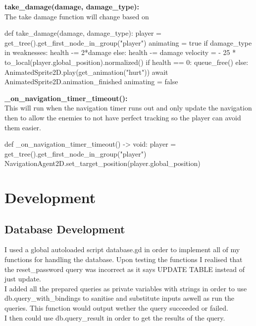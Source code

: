 \documentclass{article}
\begin{document}
        \textbf{take\_damage(damage, damage\_type):}\\
        The take damage function will change based on 
        \begin{python}
def take_damage(damage, damage_type):
   player = get_tree().get_first_node_in_group("player")
   animating = true
   if damage_type in weaknesses:
      health -= 2*damage
   else:
      health -= damage
   velocity = - 25 * to_local(player.global_position).normalized()
   if health == 0:
      queue_free()
   else:
      AnimatedSprite2D.play(get_animation("hurt"))
      await AnimatedSprite2D.animation_finished
      animating = false
        \end{python}
        \textbf{\_on\_navigation\_timer\_timeout():}\\
        This will run when the navigation timer runs out and only update the navigation then to allow the enemies to not have perfect tracking so the player can avoid them easier.\\
        \begin{python}
def _on_navigation_timer_timeout() -> void:
   player = get_tree().get_first_node_in_group("player")
   NavigationAgent2D.set_target_position(player.global_position)
        \end{python}

        \section{Development}
        \subsection{Database Development}
        I used a global autoloaded script database.gd in order to implement all of my functions for handling the database. Upon testing the functions I realised that the reset\_password query was incorrect as it says UPDATE TABLE instead of just update.\\
        I added all the prepared queries as private variables with strings in order to use db.query\_with\_bindings to sanitise and substitute inputs aswell as run the queries. This function would output wether the query succeeded or failed.\\
        I then could use db.query\_result in order to get the results of the query.\\
\end{document}
